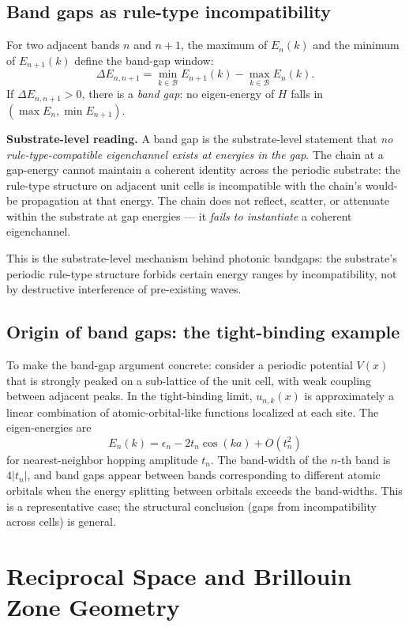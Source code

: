 \documentclass[11pt,a4paper]{article}
\begin{document}
\subsection{Band gaps as rule-type incompatibility}

For two adjacent bands $n$ and $n+1$, the maximum of $E_n(k)$ and the minimum of $E_{n+1}(k)$ define the band-gap window:
\[
\Delta E_{n,n+1} = \min_{k \in \mathcal{B}} E_{n+1}(k) - \max_{k \in \mathcal{B}} E_n(k).
\]
If $\Delta E_{n, n+1} > 0$, there is a \emph{band gap}: no eigen-energy of $H$ falls in $(\max E_n, \min E_{n+1})$.

\textbf{Substrate-level reading.} A band gap is the substrate-level statement that \emph{no rule-type-compatible eigenchannel exists at energies in the gap}. The chain at a gap-energy cannot maintain a coherent identity across the periodic substrate: the rule-type structure on adjacent unit cells is incompatible with the chain's would-be propagation at that energy. The chain does not reflect, scatter, or attenuate within the substrate at gap energies --- it \emph{fails to instantiate} a coherent eigenchannel.

This is the substrate-level mechanism behind photonic bandgaps: the substrate's periodic rule-type structure forbids certain energy ranges by incompatibility, not by destructive interference of pre-existing waves.

\subsection{Origin of band gaps: the tight-binding example}

To make the band-gap argument concrete: consider a periodic potential $V(x)$ that is strongly peaked on a sub-lattice of the unit cell, with weak coupling between adjacent peaks. In the tight-binding limit, $u_{n,k}(x)$ is approximately a linear combination of atomic-orbital-like functions localized at each site. The eigen-energies are
\[
E_n(k) = \epsilon_n - 2t_n \cos(ka) + O(t_n^{2})
\]
for nearest-neighbor hopping amplitude $t_n$. The band-width of the $n$-th band is $4|t_n|$, and band gaps appear between bands corresponding to different atomic orbitals when the energy splitting between orbitals exceeds the band-widths. This is a representative case; the structural conclusion (gaps from incompatibility across cells) is general.

\section{Reciprocal Space and Brillouin Zone Geometry}
\end{document}
